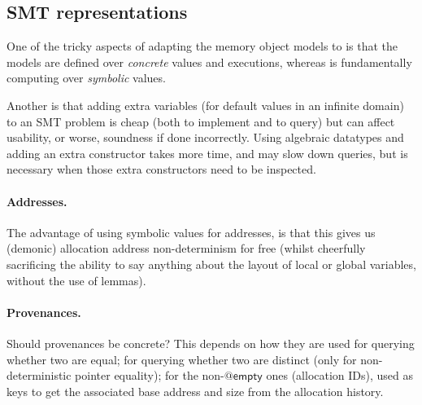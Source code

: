 \subsection{SMT representations}\label{subsec:smt-rep}

One of the tricky aspects of adapting the memory object models to  is
that the models are defined over \emph{concrete} values and executions, whereas
 is fundamentally computing over \emph{symbolic} values.

Another is that adding extra variables (for default values in an infinite
domain) to an SMT problem is cheap (both to implement and to query) but can
affect usability, or worse, soundness if done incorrectly. Using algebraic
datatypes and adding an extra constructor takes more time, and may slow down
queries, but is necessary when those extra constructors need to be inspected.

\paragraph{Addresses.}%
The advantage of using symbolic values for addresses, is that this gives us
(demonic) allocation address non-determinism for free (whilst cheerfully
sacrificing the ability to say anything about the layout of local or global
variables, without the use of lemmas).

\paragraph{Provenances.}%
Should provenances be concrete? This depends on how they are used \textemdash{}
for querying whether two are equal; for querying whether two are distinct (only
for non-deterministic pointer equality); for the non-$@\mathsf{empty}$ ones
(allocation IDs), used as keys to get the associated base address and size from
the allocation history.

